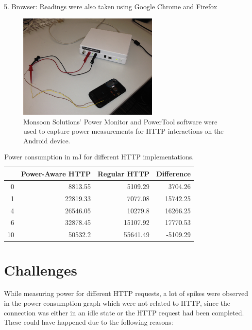 \documentclass{sigplanconf}
\begin{document}
5. Browser: Readings were also taken using Google Chrome and Firefox

\begin{figure}[ht!]
\centering
\includegraphics[width=70mm]{monitor.jpg}
\caption{Monsoon Solutions’ Power Monitor and PowerTool software were used to capture power measurements for HTTP interactions on the Android device. }
\label{fig:sp_gd_mnist}
\end{figure}





\begin{table}[htbp]
\caption{Power consumption in mJ for different HTTP implementations.}
\begin{tabular}{|r|r|r|r|}
\hline
\multicolumn{1}{|l|}{} & \multicolumn{1}{l|}{Power-Aware HTTP} & \multicolumn{1}{l|}{Regular HTTP} & \multicolumn{1}{l|}{Difference} \\ \hline
0 & 8813.55 & 5109.29 & 3704.26 \\ \hline
1 & 22819.33 & 7077.08 & 15742.25 \\ \hline
4 & 26546.05 & 10279.8 & 16266.25 \\ \hline
6 & 32878.45 & 15107.92 & 17770.53 \\ \hline
10 & 50532.2 & 55641.49 & -5109.29 \\ \hline
\end{tabular}
\label{}
\end{table}

\section{ Challenges}

While measuring power for different HTTP requests, a lot of spikes were observed in the power consumption graph which were not related to HTTP, since the connection was either in an idle state or the HTTP request had been completed. These could have happened due to the following reasons: 
\end{document}
